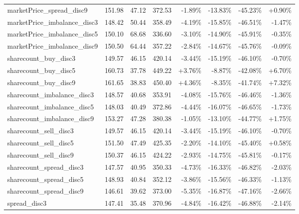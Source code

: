 \begin{table}[ht]
{\begin{tabular}{lRRR|RRRR}
marketPrice\_spread\_disc9     &    151.98 &   47.12 &  372.53 &   -1.89\% &  -13.83\% &  -45.23\% &        +0.90\% \\
marketPrice\_imbalance\_disc3      &    148.42 &   50.44 &  358.49 &   -4.19\% &  -15.85\% &  -46.51\% &       -1.47\% \\
marketPrice\_imbalance\_disc5      &    150.10 &   68.68 &  336.60 &   -3.10\% &  -14.90\% &  -45.91\% &       -0.35\% \\
marketPrice\_imbalance\_disc9      &    150.50 &   64.44 &  357.22 &   -2.84\% &  -14.67\% &  -45.76\% &       -0.09\% \\
sharecount\_buy\_disc3         &    149.57 &   46.15 &  420.14 &   -3.44\% &  -15.19\% &  -46.10\% &       -0.70\% \\
sharecount\_buy\_disc5         &    160.73 &   37.78 &  449.22 &    +3.76\% &   -8.87\% &  -42.08\% &        +6.70\% \\
sharecount\_buy\_disc9         &    161.65 &   38.83 &  450.40 &    +4.36\% &   -8.35\% &  -41.74\% &        +7.32\% \\
sharecount\_imbalance\_disc3   &    148.57 &   40.68 &  353.91 &   -4.08\% &  -15.76\% &  -46.46\% &       -1.36\% \\
sharecount\_imbalance\_disc5   &    148.03 &   40.49 &  372.86 &   -4.44\% &  -16.07\% &  -46.65\% &       -1.73\% \\
sharecount\_imbalance\_disc9   &    153.27 &   47.28 &  380.38 &   -1.05\% &  -13.10\% &  -44.77\% &        +1.75\% \\
sharecount\_sell\_disc3        &    149.57 &   46.15 &  420.14 &   -3.44\% &  -15.19\% &  -46.10\% &       -0.70\% \\
sharecount\_sell\_disc5        &    151.50 &   47.49 &  425.35 &   -2.20\% &  -14.10\% &  -45.40\% &        +0.58\% \\
sharecount\_sell\_disc9        &    150.37 &   46.15 &  424.22 &   -2.93\% &  -14.75\% &  -45.81\% &       -0.17\% \\
sharecount\_spread\_disc3      &    147.57 &   40.95 &  350.33 &   -4.73\% &  -16.33\% &  -46.82\% &       -2.03\% \\
sharecount\_spread\_disc5      &    148.93 &   40.84 &  352.12 &   -3.86\% &  -15.56\% &  -46.33\% &       -1.13\% \\
sharecount\_spread\_disc9      &    146.61 &   39.62 &  373.00 &   -5.35\% &  -16.87\% &  -47.16\% &       -2.66\% \\
spread\_disc3                 &    147.41 &   35.48 &  370.96 &   -4.84\% &  -16.42\% &  -46.88\% &       -2.14\% \\

\end{tabular}}
\end{table}
